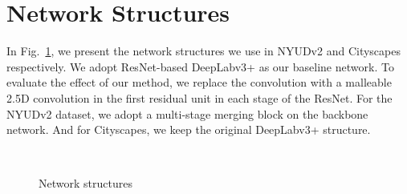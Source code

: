 \documentclass[runningheads]{llncs}
\begin{document}
\section{Network Structures}
In Fig.~\ref{fig:network_structure}, we present the network structures we use in NYUDv2 and Cityscapes respectively.
We adopt ResNet-based DeepLabv3+ as our baseline network.
To evaluate the effect of our method, we replace the  convolution with a malleable 2.5D convolution in the first residual unit in each stage of the ResNet.
For the NYUDv2 dataset, we adopt a multi-stage merging block on the backbone network.
And for Cityscapes, we keep the original DeepLabv3+ structure.

\begin{figure}[htbp]
  \centering
  \\
  \caption{
    Network structures
  }
  \label{fig:network_structure}
\end{figure}
\end{document}
